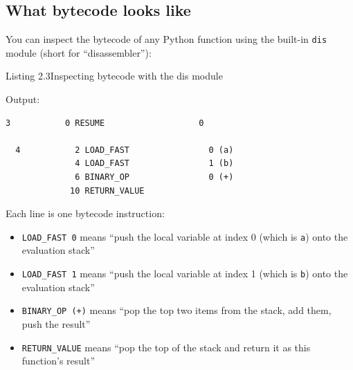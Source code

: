 \subsection*{What bytecode looks like}\label{02-runtime-initialization:what-bytecode-looks-like}

You can inspect the bytecode of any Python function using the built-in \texttt{dis} module (short for ``disassembler''):

\begin{codeboxcap}[short]{\textcolor{accent}{Listing 2.3}\enspace Inspecting bytecode with the dis module}

\begin{Shaded}
\begin{Highlighting}[]

    \OperatorTok{+}

\end{Highlighting}
\end{Shaded}

\end{codeboxcap}

\noindent{}Output:

\begin{outputbox}[short]
\begin{Verbatim}[fontsize=\codesize, breaklines, breakanywhere, breaksymbolleft={\tiny\textcolor{muted}{$\hookrightarrow$}}]
  3           0 RESUME                   0

  4           2 LOAD_FAST                0 (a)
              4 LOAD_FAST                1 (b)
              6 BINARY_OP                0 (+)
             10 RETURN_VALUE
\end{Verbatim}
\end{outputbox}

\noindent{}Each line is one bytecode instruction:

\begin{itemize}
\tightlist
\item
  \texttt{LOAD\_FAST\ 0} means ``push the local variable at index 0 (which is \texttt{a}) onto the evaluation stack''
\item
  \texttt{LOAD\_FAST\ 1} means ``push the local variable at index 1 (which is \texttt{b}) onto the evaluation stack''
\item
  \texttt{BINARY\_OP\ (+)} means ``pop the top two items from the stack, add them, push the result''
\item
  \texttt{RETURN\_VALUE} means ``pop the top of the stack and return it as this function's result''
\end{itemize}


